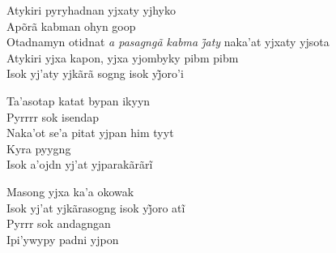 \begin{linenumbers}\begingroup\raggedright
 
\noindent   Atykiri pyryhadnan yjxaty yjhyko\\
  Apõrã kabman ohyn goop\\
  Otadnamyn otidnat \emph{a pasagngã kabma j̃aty} naka’at yjxaty yjsota\\
  Atykiri yjxa kapon, yjxa yjombyky pibm pibm\\
  Isok yj’aty yjkãrã sogng isok yj̃oro’i
 
\end{linenumbers}\endgroup

\bigskip

\begin{linenumbers}\begingroup\raggedright
 
\noindent   Ta'asotap katat bypan ikyyn\\
  Pyrrrr sok isendap\\
  Naka'ot se'a pitat yjpan him tyyt\\
  Kyra pyygng\\
  Isok a’ojdn yj’at yjparakãrãrĩ
 
\end{linenumbers}\endgroup

\bigskip

\begin{linenumbers}\begingroup\raggedright
 
\noindent   Masong yjxa ka'a okowak\\
  Isok yj’at yjkãrasogng isok yj̃oro atĩ\\
  Pyrrr sok andagngan\\
  Ipi'ywypy padni yjpon
 
\end{linenumbers}\endgroup

